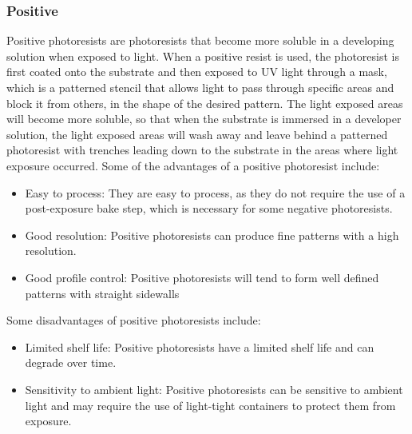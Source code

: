 \subsubsection{Positive}
Positive photoresists are photoresists that become more soluble in a developing solution when exposed to light. When a positive resist is used, the photoresist is first coated onto the substrate and then exposed to UV light through a mask, which is a patterned stencil that allows light to pass through specific areas and block it from others, in the shape of the desired pattern. The light exposed areas will become more soluble, so that when the substrate is immersed in a developer solution, the light exposed areas will wash away and leave behind a patterned photoresist with trenches leading down to the substrate in the areas where light exposure occurred.
Some of the advantages of a positive photoresist include:
\begin{itemize}
    \item Easy to process: They are easy to process, as they do not require the use of a post-exposure bake step, which is necessary for some negative photoresists.
    \item Good resolution: Positive photoresists can produce fine patterns with a high resolution.
    \item Good profile control: Positive photoresists will tend to form well defined patterns with straight sidewalls
\end{itemize}
Some disadvantages of positive photoresists include:
\begin{itemize}
    \item Limited shelf life: Positive photoresists have a limited shelf life and can degrade over time.
    \item Sensitivity to ambient light: Positive photoresists can be sensitive to ambient light and may require the use of light-tight containers to protect them from exposure.
\end{itemize}
